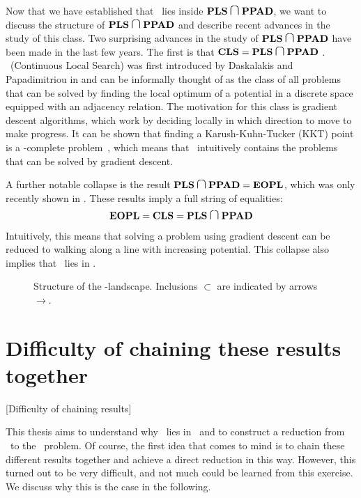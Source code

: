 Now that we have established that \Tarski\ lies inside $\PLS \medcap \PPAD$, we want to discuss the structure of $\PLS \medcap \PPAD$ and describe recent advances in the study of this class. Two surprising advances in the study of $\PLS \medcap \PPAD$ have been made in the last few years. The first is that $\CLS = \PLS \medcap \PPAD$ . \CLS\ (Continuous Local Search) was first introduced by Daskalakis and Papadimitriou in  and can be informally thought of as the class of all problems that can be solved by finding the local optimum of a potential in a discrete space equipped with an adjacency relation. The motivation for this class is gradient descent algorithms, which work by deciding locally in which direction to move to make progress. It can be shown that finding a Karush-Kuhn-Tucker (KKT) point is a \PLS-complete problem~\cite{daskalakis_continuous_2011}, which means that \CLS\ intuitively contains the problems that can be solved by gradient descent.

A further notable collapse is the result $\PLS \medcap \PPAD = \EOPL$, which was only recently shown in . These results imply a full string of equalities:
\begin{align*}
	\EOPL = \CLS = \PLS \medcap \PPAD
\end{align*}
Intuitively, this means that solving a problem using gradient descent can be reduced to walking along a line with increasing potential. This collapse also implies that \Tarski\ lies in \EOPL\@.

\begin{figure*}
	\centering
	\large
	\caption[\TFNP-landscape]{Structure of the \TFNP-landscape. Inclusions $\subset$ are indicated by arrows $\rightarrow$.}\label{fig:tfnp_structure}
\end{figure*}

\section{Difficulty of chaining these results together}[Difficulty of chaining results]

This thesis aims to understand why \Tarski\ lies in \EOPL\ and to construct a reduction from \Tarski\ to the \EndOfPotentialLine\ problem. Of course, the first idea that comes to mind is to chain these different results together and achieve a direct reduction in this way. However, this turned out to be very difficult, and not much could be learned from this exercise. We discuss why this is the case in the following.

